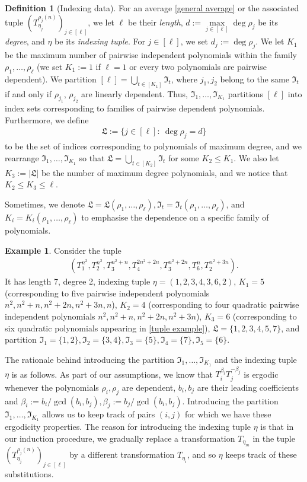 \documentclass[11pt]{amsart}
\theoremstyle{definition}
\newtheorem*{definition}{Definition}
\newtheorem{example}{Example}
\newcommand{\FI}{{\mathfrak I}}
\newcommand{\FL}{{\mathfrak L}}
\newcommand{\brac}[1]{\mathopen{}\left( #1 \mathclose{}\right)}
\begin{document}
\begin{definition}[Indexing data] For an average \eqref{general average} or the associated tuple $\brac{T_{\eta_j}^{\rho_j(n)}}_{j\in[\ell]}$, we let $\ell$ be their \emph{length}, $d:= \max\limits_{j\in[\ell]}\deg \rho_j$ be its \emph{degree}, and $\eta$ be its \emph{indexing tuple}. For $j\in[\ell]$, we set $d_j := \deg \rho_j$.  We let $K_1$ be the maximum number of pairwise independent polynomials within the family $\rho_1,\ldots, \rho_\ell$ (we set $K_1:=1$ if $\ell=1$ or every two polynomials are pairwise dependent). We partition $[\ell]=\bigcup_{t\in[K_1]} \FI_t$, where $j_1, j_2$ belong to the same $\FI_t$ if and only if $\rho_{j_1}$, $\rho_{j_2}$ are linearly dependent. Thus, $\FI_1, \ldots, \FI_{K_1}$ partitions $[\ell]$ into index sets corresponding to families of pairwise dependent polynomials.
Furthermore, we define
\begin{align*}
    \FL := \{j\in[\ell]:\ \deg \rho_j = d\}
\end{align*}
to be the set of indices corresponding to polynomials of maximum degree, and we rearrange $\FI_1, \ldots, \FI_{K_1}$ so that $\FL =\bigcup_{t\in[K_2]}\FI_t$ for some $K_2\leq K_1$. We also let $K_3 := |\FL|$ be the number of maximum degree polynomials, and we notice that $K_2\leq K_3\leq \ell$.
\end{definition}
Sometimes, we denote $\FL = \FL(\rho_1, \ldots, \rho_\ell), \FI_t=\FI_t(\rho_1, \ldots, \rho_\ell)$, and $K_i = K_i(\rho_1, \ldots, \rho_\ell)$ to emphasise the dependence on a specific family of polynomials.


\begin{example}\label{Ex: 7 tuple}
Consider the tuple
\begin{align}\label{tuple example}
    (T_1^{n^2}, T_2^{n^2}, T_3^{n^2+n}, T_4^{2n^2+2n}, T_3^{n^2+2n}, T_6^n, T_2^{n^2+3n}).
\end{align}
It has length 7, degree 2, indexing tuple $\eta = (1, 2, 3, 4, 3, 6, 2)$, $K_1 = 5$ (corresponding to five pairwise independent polynomials $n^2, n^2+n, n^2 + 2n, n^2 + 3n, n$), $K_2 = 4$ (corresponding to four quadratic pairwise independent polynomials $n^2, n^2 + n, n^2 + 2n, n^2+3n$), $K_3 = 6$ (corresponding to six quadratic polynomials appearing in \eqref{tuple example}), $\FL = \{1, 2, 3, 4, 5, 7\}$, and partition $\FI_1 = \{1, 2\}, \FI_2 = \{3, 4\}, \FI_3 = \{5\}, \FI_4 = \{7\}, \FI_5 = \{6\}$.
\end{example}


The rationale behind introducing the partition $\FI_1, \ldots, \FI_{K_1}$ and the indexing tuple $\eta$ is as follows. As part of our assumptions, we know that  $T_i^{\beta_i} T_j^{-\beta_j}$ is ergodic whenever the polynomials $\rho_i, \rho_j$ are dependent, $b_i, b_j$ are their leading coefficients and $\beta_i := b_i/\gcd(b_i, b_j), \beta_j := b_j/\gcd(b_i, b_j)$. Introducing the partition $\FI_1, \ldots, \FI_{K_1}$ allows us to keep track of pairs $(i,j)$ for which we have these ergodicity properties. The reason for introducing the indexing tuple $\eta$ is that  in our induction procedure, we gradually replace a transformation $T_{\eta_m}$ in the tuple $(T_{\eta_j}^{\rho_j(n)})_{j\in[\ell]}$ by a different transformation $T_{\eta_i}$, and so $\eta$ keeps track of these substitutions.
\end{document}
